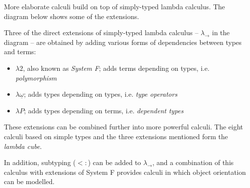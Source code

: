 \documentclass[11pt,twoside,a4paper]{article} %
\begin{document}
More elaborate calculi build on top of simply-typed lambda calculus. The
diagram below shows some of the extensions.
\begin{center}
\end{center}
Three of the direct extensions of simply-typed lambda calculus -- $\lambda_\rightarrow$ in the
diagram -- are obtained by adding various forms of dependencies between types
and terms:
\begin{itemize}
\item $\lambda 2$, also known as \emph{System F}; adds terms depending on
types, i.e. \emph{polymorphism}
\item $\lambda\underline{\omega}$; adds types depending on types, i.e. \emph{type
operators}
\item $\lambda P$; adds types depending on terms, i.e. \emph{dependent types}
\end{itemize}
These extensions can be combined further into more powerful calculi. The eight
calculi based on simple types and the three extensions mentioned form the
\emph{lambda cube}\cite{b91}.

In addition, subtyping ($<:$) can be added to $\lambda_\rightarrow$, and a
combination of this calculus with extensions of System F provides calculi in
which object orientation can be modelled.
\end{document}
